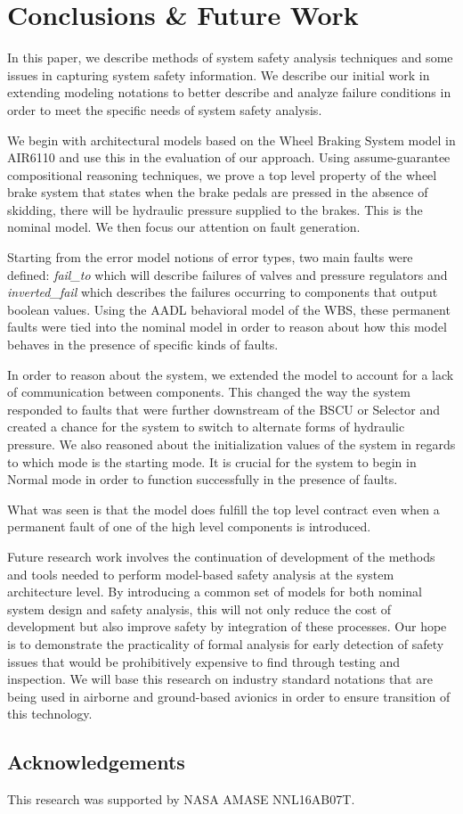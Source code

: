 \section{Conclusions \& Future Work}
In this paper, we describe methods of system safety analysis techniques and some issues in capturing system safety information. We describe our initial work in extending modeling notations to better describe and analyze failure conditions in order to meet the specific needs of system safety analysis. 

We begin with architectural models based on the Wheel Braking System model in AIR6110 \cite{AIR6110} and use this in the evaluation of our approach. Using assume-guarantee compositional reasoning techniques, we prove a top level property of the wheel brake system that states when the brake pedals are pressed in the absence of skidding, there will be hydraulic pressure supplied to the brakes. This is the nominal model. We then focus our attention on fault generation. 

Starting from the error model notions of error types, two main faults were defined: \textit{fail\_to} which will describe failures of valves and pressure regulators and \textit{inverted\_fail} which describes the failures occurring to components that output boolean values. Using the AADL behavioral model of the WBS, these permanent faults were tied into the nominal model in order to reason about how this model behaves in the presence of specific kinds of faults. 

In order to reason about the system, we extended the model to account for a lack of communication between components. This changed the way the system responded to faults that were further downstream of the BSCU or Selector and created a chance for the system to switch to alternate forms of hydraulic pressure. We also reasoned about the initialization values of the system in regards to which mode is the starting mode. It is crucial for the system to begin in Normal mode in order to function successfully in the presence of faults. 

What was seen is that the model does fulfill the top level contract even when a permanent fault of one of the high level components is introduced. 

Future research work involves the continuation of development of the methods and tools needed to perform model-based safety analysis at the system architecture level. By introducing a common set of models for both nominal system design and safety analysis, this will not only reduce the cost of development but also improve safety by integration of these processes. Our hope is to demonstrate the practicality of formal analysis for early detection of safety issues that would be prohibitively expensive to find through testing and inspection. We will base this research on industry standard notations that are being used in airborne and ground-based avionics in order to ensure transition of this technology. 

\subsection*{Acknowledgements} This research was supported by NASA AMASE NNL16AB07T. 


